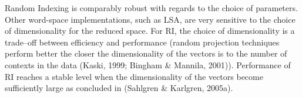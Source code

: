 Random Indexing is comparably robust with regards to the choice of parameters. Other
word-space implementations, such as LSA, are very sensitive to the choice of
dimensionality for the reduced space. For RI, the choice of dimensionality is a
trade--off between efficiency and performance (random projection techniques
perform better the closer the dimensionality of the vectors is to the number of
contexts in the data (Kaski, 1999; Bingham \& Mannila, 2001)). Performance of RI reaches a stable level
when the dimensionality of the vectors become sufficiently large as concluded in  (Sahlgren \& Karlgren, 2005a).

